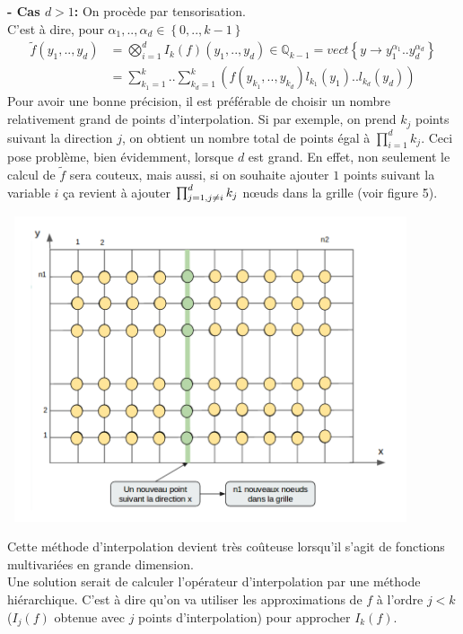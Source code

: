 \vspace{1cm}
\hspace{0.5cm}
\textbf{ - Cas $d>1$: }
On procède par tensorisation. \\
C'est à dire, pour $\alpha_1,..,\alpha_d \in \left \{0,.., k-1 \right \}$ \\
\begin{align}
   \tilde{f} (y_1,..,y_d)& = \bigotimes_{i=1}^d I_k (f)(y_1,..,y_d) \in \mathbb{Q}_{k-1} = vect \left \{ y \rightarrow y_1^{\alpha_1}..y_d^{\alpha_d} \right \} \\
	 & = \sum_{k_1=1}^k..\sum_{k_d=1}^k (f(y_{k_1},..,y_{k_d}) l_{k_1}(y_1)..l_{k_d}(y_d)) \nonumber
\end{align}
\hspace{0.5cm}
Pour avoir une bonne précision, il est préférable de choisir un nombre relativement grand de points d'interpolation.
Si par exemple, on prend $k_j$ points suivant la direction $j$, on obtient un nombre total de points égal à $\prod_{i=1}^d k_j$.
Ceci pose problème, bien évidemment, lorsque $d$ est grand. En effet, non seulement le calcul de $\tilde{f}$ sera couteux, mais aussi,
si on souhaite ajouter $1$ points suivant la variable $i$ ça revient à ajouter $\prod_{j=1,\\ j \neq i}^d k_j$ nœuds dans la grille (voir figure 5).\\
\begin{center}
\includegraphics[height=9cm,width=12cm]{images/grille.png}
\end{center}

Cette méthode d'interpolation devient très coûteuse lorsqu'il s'agit de fonctions multivariées en grande dimension.\\
Une solution serait de calculer l'opérateur d'interpolation par une méthode hiérarchique. C'est à dire qu'on va
utiliser les approximations de $f$ à l'ordre $j<k$ ($I_{j}(f)$ obtenue avec $j$ points d'interpolation) pour approcher $I_{k}(f)$.

